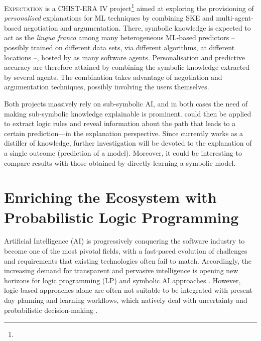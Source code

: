 \documentclass[12pt,a4paper,openright,twoside]{book}
\begin{document}
\textsc{Expectation} is a CHIST-ERA IV project\footnote{} aimed at exploring the provisioning of \emph{personalised} explanations for ML techniques by combining SKE and multi-agent-based negotiation and argumentation.
%
There, symbolic knowledge is expected to act as the \emph{lingua franca} among many heterogeneous ML-based predictors -- possibly trained on different data sets, via different algorithms, at different locations --, hosted by as many software agents.
%
Personalisation and predictive accuracy are therefore attained by combining the symbolic knowledge extracted by several agents.
%
The combination takes advantage of negotiation and argumentation techniques, possibly involving the users themselves.

Both projects massively rely on sub-symbolic AI, and in both cases the need of making sub-symbolic knowledge explainable is prominent.
%
\psyke{} could then be applied to extract logic rules and reveal information about the path that leads to a certain prediction---in the explanation perspective.
%
Since \psyke{} currently works as a distiller of knowledge, further investigation will be devoted to the explanation of a single outcome (prediction of a model).
%
Moreover, it could be interesting to compare results with those obtained by directly learning a symbolic model.

\chapter[Enriching the Ecosystem with PLP]{Enriching the Ecosystem with Probabilistic Logic Programming}
\label{chap:plp}


Artificial Intelligence (AI) is progressively conquering the software industry to become one of the most pivotal fields, with a fast-paced evolution of challenges and requirements that existing technologies often fail to match.
%
Accordingly, the increasing demand for transparent and pervasive intelligence is opening new horizons for logic programming (LP) and symbolic AI approaches \cite{lptech4mas-jaamas35,xaiethics-aiia2020,ortega2021symbolic}.
%
However, logic-based approaches alone are often not suitable to be integrated with present-day planning and learning workflows, which natively deal with uncertainty and probabilistic decision-making \cite{logictech-information11,xaisurvey-ia14}.
\end{document}
